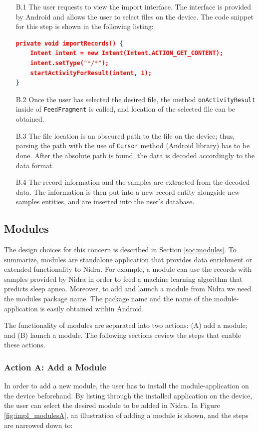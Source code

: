 \begin{itemize}
    \item[B.1] The user requests to view the import interface. The interface is provided by Android and allows the user to select files on the device. The code snippet for this step is shown in the following listing:
\begin{lstlisting}[language=json, caption={}, captionpos=b]
private void importRecords() {
    Intent intent = new Intent(Intent.ACTION_GET_CONTENT);
    intent.setType("*/*");
    startActivityForResult(intent, 1);
}

\end{lstlisting}
    \item[B.2] Once the user has selected the desired file, the method \verb|onActivityResult| inside of \verb|FeedFragment| is called, and location of the selected file can be obtained. 
    \item[B.3] The file location is an obscured path to the file on the device; thus, parsing the path with the use of \verb|Cursor| method (Android library) has to be done. After the absolute path is found, the data is decoded accordingly to the data format.
    \item[B.4] The record information and the samples are extracted from the decoded data. The information is then put into a new record entity alongside new samples entities, and are inserted into the user's database. 
\end{itemize}

\subsection{Modules}
The design choices for this concern is described in Section \ref{soc:modules}. To summarize, modules are standalone application that provides data enrichment or extended functionality to Nidra. For example, a module can use the records with samples provided by Nidra in order to feed a machine learning algorithm that predicts sleep apnea. Moreover, to add and launch a module from Nidra we need the modules package name. The package name and the name of the module-application is easily obtained within Android. 

The functionality of modules are separated into two actions: (A) add a module; and (B) launch a module.  The following sections review the steps that enable these actions. 

\subsubsection{Action A: Add a Module}
In order to add a new module, the user has to install the module-application on the device beforehand. By listing through the installed application on the device, the user can select the desired module to be added in Nidra. In Figure \ref{fig:impl_modulesA}, an illustration of adding a module is shown, and the steps are narrowed down to:

